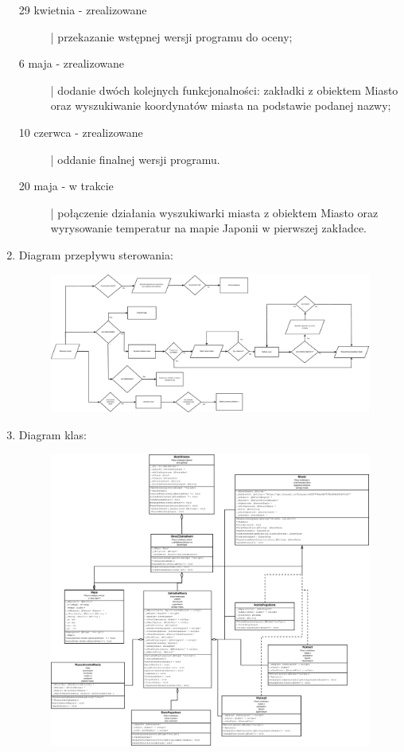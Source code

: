 \documentclass[a4paper]{article}
\begin{document}
\begin{enumerate}
\begin{description}
\item[29 kwietnia - zrealizowane] | przekazanie wstępnej wersji programu do oceny;

\item[6 maja - zrealizowane] | dodanie dwóch kolejnych funkcjonalności: zakładki z obiektem Miasto oraz wyszukiwanie koordynatów miasta na podstawie podanej nazwy;

\item[10 czerwca - zrealizowane] | oddanie finalnej wersji programu.

\item[20 maja - w trakcie] | połączenie działania wyszukiwarki miasta z obiektem Miasto oraz wyrysowanie temperatur na mapie Japonii w pierwszej zakładce.
\end{description}

\pagebreak
\item Diagram przepływu sterowania:\\
\begin{figure}[H]
\includegraphics[width=15cm]{przeplyw.eps}
\end{figure}

\pagebreak
\item Diagram klas:\\
\begin{figure}[H]
\includegraphics[width=14cm]{diagram_klas.eps}
\end{figure}


\end{enumerate}
\end{document}
